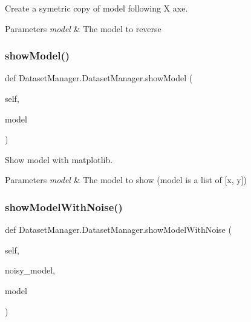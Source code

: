 Create a symetric copy of model following X axe. 


\begin{DoxyParams}{Parameters}
{\em model} & The model to reverse \\
\hline
\end{DoxyParams}
\mbox{\label{classDatasetManager_1_1DatasetManager_aaa1d5165200cf8cec731fd8d08bdf2bc}} 
\subsubsection{\texorpdfstring{showModel()}{showModel()}}
{\footnotesize\ttfamily def Dataset\+Manager.\+Dataset\+Manager.\+show\+Model (\begin{DoxyParamCaption}\item[{}]{self,  }\item[{}]{model }\end{DoxyParamCaption})}



Show model with matplotlib. 


\begin{DoxyParams}{Parameters}
{\em model} & The model to show (model is a list of \mbox{[}x, y\mbox{]}) \\
\hline
\end{DoxyParams}
\mbox{\label{classDatasetManager_1_1DatasetManager_ad25e44f84d74a74eae1c301ca29eb86f}} 
\subsubsection{\texorpdfstring{showModelWithNoise()}{showModelWithNoise()}}
{\footnotesize\ttfamily def Dataset\+Manager.\+Dataset\+Manager.\+show\+Model\+With\+Noise (\begin{DoxyParamCaption}\item[{}]{self,  }\item[{}]{noisy\+\_\+model,  }\item[{}]{model }\end{DoxyParamCaption})}



